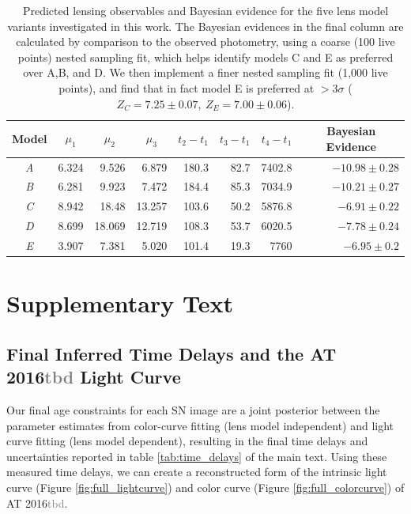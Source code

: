 \documentclass[12pt,dvipsnames]{article}
\def\SNABC{AT 2016{\textcolor{Gray}{tbd}}\xspace}
\begin{document}
\begin{table}[h]
\begin{tabular}{crrrrrrr}
    
    
    \multicolumn{1}{c}{Model} &\multicolumn{1}{c}{$\mu_1$} & \multicolumn{1}{c}{$\mu_2$} &\multicolumn{1}{c}{$\mu_3$} &\multicolumn{1}{c}{$t_2-t_1$} & \multicolumn{1}{c}{$t_3-t_1$}& \multicolumn{1}{c}{$t_4-t_1$} & \multicolumn{1}{c}{Bayesian Evidence}\\
\midrule
\textit{A} & 6.324 & 9.526 & 6.879 & 180.3 & 82.7&7402.8&$-10.98\pm0.28$ \\
\textit{B} & 6.281 & 9.923 & 7.472 & 184.4 & 85.3&7034.9&$-10.21\pm0.27$ \\
\textit{C} &8.942  & 18.48 & 13.257 & 103.6 & 50.2&5876.8&$-6.91\pm0.22$ \\
\textit{D} & 8.699 & 18.069 & 12.719 & 108.3 & 53.7&6020.5&$-7.78\pm0.24$ \\
\textit{E} & 3.907 & 7.381 & 5.020 & 101.4 & 19.3&7760&$-6.95\pm0.2$ \\
\end{tabular}
\caption{\label{tab:model_evidence}Predicted lensing observables and Bayesian evidence for the five lens model variants investigated in this work. The Bayesian evidences in the final column are calculated by comparison to the observed photometry, using a coarse (100 live points) nested sampling fit, which helps identify models C and E as preferred over A,B, and D. We then implement a finer nested sampling fit (1,000 live points), and find that in fact model E is preferred at $>3\sigma$ ($Z_C=7.25\pm0.07, \ Z_E=7.00\pm0.06$).}
\end{table}

\section*{Supplementary Text}

\subsection*{Final Inferred Time Delays and the \SNABC Light Curve}

Our final age constraints for each SN image are a joint posterior between the parameter estimates from color-curve fitting (lens model independent) and light curve fitting (lens model dependent), resulting in the final time delays and uncertainties reported in table \ref{tab:time_delays} of the main text. Using these measured time delays, we can create a reconstructed form of the intrinsic light curve (Figure \ref{fig:full_lightcurve}) and color curve (Figure \ref{fig:full_colorcurve}) of \SNABC.
\end{document}
